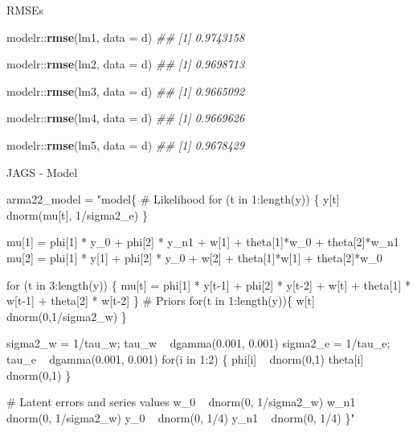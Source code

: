 \documentclass[11pt,ignorenonframetext,]{beamer}
\newenvironment{Shaded}{}{}
\newcommand{\CommentTok}[1]{\textcolor[rgb]{0.38,0.63,0.69}{\textit{#1}}}
\newcommand{\DataTypeTok}[1]{\textcolor[rgb]{0.56,0.13,0.00}{#1}}
\newcommand{\KeywordTok}[1]{\textcolor[rgb]{0.00,0.44,0.13}{\textbf{#1}}}
\newcommand{\NormalTok}[1]{#1}
\newcommand{\OperatorTok}[1]{\textcolor[rgb]{0.40,0.40,0.40}{#1}}
\newcommand{\StringTok}[1]{\textcolor[rgb]{0.25,0.44,0.63}{#1}}
\let\oldShaded\Shaded
\let\endoldShaded\endShaded
\renewenvironment{Shaded}{\footnotesize\begin{spacing}{0.9}\oldShaded}{\endoldShaded\end{spacing}}
\let\oldverbatim\verbatim
\let\endoldverbatim\endverbatim
\newcommand{\tinyoutput}{
  \renewenvironment{Shaded}{\tiny\begin{spacing}{0.9}\oldShaded}{\endoldShaded\end{spacing}}
  \renewenvironment{verbatim}{\tiny\begin{spacing}{0.9}\oldverbatim}{\endoldverbatim\end{spacing}}
}
\begin{document}
\begin{frame}[fragile]{RMSEs}
\protect\hypertarget{rmses}{}

\begin{Shaded}
\begin{Highlighting}[]
\NormalTok{modelr}\OperatorTok{::}\KeywordTok{rmse}\NormalTok{(lm1, }\DataTypeTok{data =}\NormalTok{ d)}
\CommentTok{## [1] 0.9743158}

\NormalTok{modelr}\OperatorTok{::}\KeywordTok{rmse}\NormalTok{(lm2, }\DataTypeTok{data =}\NormalTok{ d)}
\CommentTok{## [1] 0.9698713}

\NormalTok{modelr}\OperatorTok{::}\KeywordTok{rmse}\NormalTok{(lm3, }\DataTypeTok{data =}\NormalTok{ d)}
\CommentTok{## [1] 0.9665092}

\NormalTok{modelr}\OperatorTok{::}\KeywordTok{rmse}\NormalTok{(lm4, }\DataTypeTok{data =}\NormalTok{ d)}
\CommentTok{## [1] 0.9669626}

\NormalTok{modelr}\OperatorTok{::}\KeywordTok{rmse}\NormalTok{(lm5, }\DataTypeTok{data =}\NormalTok{ d)}
\CommentTok{## [1] 0.9678429}
\end{Highlighting}
\end{Shaded}

\end{frame}

\begin{frame}[fragile]{JAGS - Model}
\protect\hypertarget{jags---model}{}

\tinyoutput

\begin{Shaded}
\begin{Highlighting}[]
\NormalTok{arma22_model =}\StringTok{ "model\{}
\StringTok{# Likelihood}
\StringTok{  for (t in 1:length(y)) \{}
\StringTok{    y[t] ~ dnorm(mu[t], 1/sigma2_e)}
\StringTok{  \}                                   }

\StringTok{  mu[1] = phi[1] * y_0  + phi[2] * y_n1 + w[1] + theta[1]*w_0  + theta[2]*w_n1}
\StringTok{  mu[2] = phi[1] * y[1] + phi[2] * y_0  + w[2] + theta[1]*w[1] + theta[2]*w_0   }

\StringTok{  for (t in 3:length(y)) \{ }
\StringTok{    mu[t] = phi[1] * y[t-1] + phi[2] * y[t-2] + w[t] + theta[1] * w[t-1] + theta[2] * w[t-2]}
\StringTok{  \}}
\StringTok{  }
\StringTok{# Priors}
\StringTok{  for(t in 1:length(y))\{}
\StringTok{    w[t] ~ dnorm(0,1/sigma2_w)}
\StringTok{  \}}

\StringTok{  sigma2_w = 1/tau_w; tau_w ~ dgamma(0.001, 0.001) }
\StringTok{  sigma2_e = 1/tau_e; tau_e ~ dgamma(0.001, 0.001) }
\StringTok{  for(i in 1:2) \{}
\StringTok{    phi[i] ~ dnorm(0,1)}
\StringTok{    theta[i] ~ dnorm(0,1)}
\StringTok{  \}}

\StringTok{# Latent errors and series values}
\StringTok{  w_0  ~ dnorm(0, 1/sigma2_w)}
\StringTok{  w_n1 ~ dnorm(0, 1/sigma2_w)}
\StringTok{  y_0  ~ dnorm(0, 1/4)}
\StringTok{  y_n1 ~ dnorm(0, 1/4)}
\StringTok{\}"}
\end{Highlighting}
\end{Shaded}

\end{frame}
\end{document}
